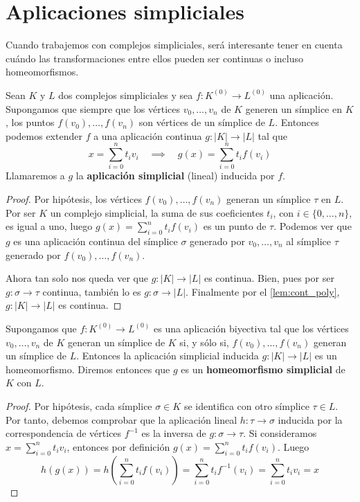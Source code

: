 \section{Aplicaciones simpliciales}

Cuando trabajemos con complejos simpliciales, será interesante tener en cuenta cuándo las 
transformaciones entre ellos pueden ser continuas o incluso homeomorfismos. 

\begin{lema}
	Sean $K$ y $L$ dos complejos simpliciales y sea $f: K^{(0)} \rightarrow L^{(0)}$ una aplicación. 
	Supongamos que siempre que los vértices $v_0, \dots, v_n$ de $K$ generen un símplice en $K$, 
	los puntos $f(v_0), \dots, f(v_n)$ son vértices de un símplice de $L$. Entonces podemos extender $f$ 
	a una aplicación continua $g:|K| \rightarrow |L|$ tal que
	\[ x = \sum_{i=0}^{n}t_iv_i \quad \implies \quad g(x) = \sum_{i=0}^{n}t_if(v_i) \]
	Llamaremos a $g$ la \textbf{aplicación simplicial} (lineal) inducida por $f$.
\end{lema}

\begin{proof}
	Por hipótesis, los vértices $f(v_0), \dots, f(v_n)$ generan un símplice $\tau$ en $L$. Por 
	ser $K$ un complejo simplicial, la suma de sus coeficientes $t_i$, con $i \in \{0, \dots, n\}$,  
	es igual a uno, luego $g(x) = \sum_{i=0}^{n}t_if(v_i)$ es un punto de $\tau$. Podemos ver que 
	$g$ es una aplicación continua del símplice $\sigma$ generado por $v_0, \dots, v_n$ al símplice 
	$\tau$ generado por $f(v_0), \dots, f(v_n)$.
	
	Ahora tan solo nos queda ver que $g:|K| \rightarrow |L|$ es continua. Bien, pues por ser 
	$g: \sigma \rightarrow \tau$ continua, también lo es $g: \sigma \rightarrow |L|$. Finalmente 
	por el \autoref{lem:cont_poly}, $g:|K| \rightarrow |L|$ es continua.
\end{proof}

\begin{lema}\label{lem:homeo_complex}
	Supongamos que $f:K^{(0)} \rightarrow L^{(0)}$ es una aplicación biyectiva tal que los vértices 
	$v_0, \dots, v_n$ de $K$ generan un símplice de $K$ si, y sólo si, $f(v_0), \dots, f(v_n)$ 
	generan un símplice de $L$. Entonces la aplicación simplicial inducida $g:|K| \rightarrow |L|$ 
	es un homeomorfismo. Diremos entonces que $g$ es un \textbf{homeomorfismo simplicial} de $K$ con $L$.
\end{lema}

\begin{proof}
	Por hipótesis, cada símplice $\sigma \in K$ se identifica con otro símplice $\tau \in L$. 
	Por tanto, debemos comprobar que la aplicación lineal $h: \tau \rightarrow \sigma$ inducida por 
	la correspondencia de vértices $f^{-1}$ es la inversa de $g: \sigma \rightarrow \tau$. Si 
	consideramos $x = \sum_{i=0}^{n}t_i v_i$, entonces por definición $g(x) = \sum_{i=0}^{n}t_if(v_i)$.
	Luego
	\[ h(g(x)) = h(\sum_{i=0}^{n}t_if(v_i)) = \sum_{i=0}^{n}t_i f^{-1}(v_i) = \sum_{i=0}^{n}t_i v_i = x \]
\end{proof}

